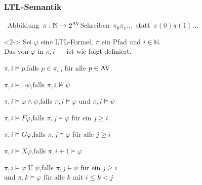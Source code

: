     \begin{frame}
      \frametitle{LTL-Semantik}

      \mbox{ Abbildung $\pi : \mathbb{N} \to 2^{\textup{AV}}$\quad Schreiben $\pi_0\pi_1\dots$ statt $\pi(0)\pi(1)\dots$\hspace*{-10mm}}

      \begin{Definition}<2->
        Sei $\varphi$ eine LTL-Formel, $\pi$ ein Pfad und $i \in \mathbb{N}$.\\
        Das  von $\varphi$ in $\pi,i$ ~~ ist wie folgt definiert.
        \vspace*{-.1pt}
        \begin{Itemize}
          \item<3->
            $\pi,i \models p$,\quad falls $p \in \pi_i$\,, für alle $p \in \textup{AV}$
            \vspace*{-.08pt}
          \item<4->
            $\pi,i \models \neg \psi$,\quad falls $\pi,i \not\models \psi$
            \vspace*{-.08pt}
          \item<5->
            $\pi,i \models \varphi \land \psi$,\quad falls $\pi,i \models \varphi$ und $\pi,i \models \psi$
            \vspace*{-.08pt}
          \item<6->
            $\pi,i \models F\varphi$,\quad falls $\pi,j \models \varphi$ für ein $j \geqslant i$
            \vspace*{-.08pt}
          \item<7->
            $\pi,i \models G\varphi$,\quad falls $\pi,j \models \varphi$ für alle $j \geqslant i$
            \vspace*{-.08pt}
          \item<8->
            $\pi,i \models X\varphi$,\quad falls $\pi,i\!+\!1 \models \varphi$
            \vspace*{-.08pt}
          \item<9->
            $\pi,i \models \varphi\mathbin{U}\psi$,\quad falls $\pi,j \models \psi$ für ein $j \geqslant i$\\
            \hspace*{28mm}und $\pi,k \models \varphi$ für alle $k$ mit $i \leqslant k < j$
        \end{Itemize}
      \end{Definition}


\end{frame}
